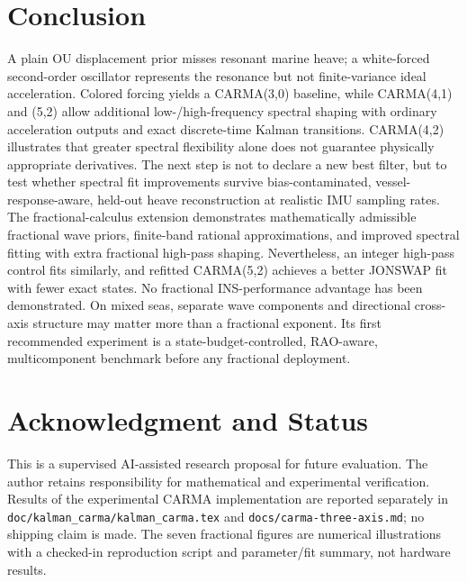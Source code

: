 \documentclass[10pt,journal]{IEEEtran}
\begin{document}


\section{Conclusion}
A plain OU displacement prior misses resonant marine
heave; a white-forced second-order oscillator represents
the resonance but not finite-variance ideal acceleration.
Colored forcing yields a CARMA(3,0) baseline, while
CARMA(4,1) and (5,2) allow additional low-/high-frequency
spectral shaping with ordinary acceleration outputs and
exact discrete-time Kalman transitions. CARMA(4,2)
illustrates that greater spectral flexibility alone
does not guarantee physically appropriate derivatives.
The next step is not to declare a new best filter, but
to test whether spectral fit improvements survive
bias-contaminated, vessel-response-aware, held-out
heave reconstruction at realistic IMU sampling rates.
The fractional-calculus extension demonstrates mathematically admissible
fractional wave priors, finite-band rational approximations, and improved
spectral fitting with extra fractional high-pass shaping. Nevertheless,
an integer high-pass control fits similarly, and refitted CARMA(5,2)
achieves a better JONSWAP fit with fewer exact states. No fractional
INS-performance advantage has been demonstrated.
On mixed seas, separate wave components and directional
cross-axis structure may matter more than a fractional exponent.
Its first recommended experiment is a state-budget-controlled,
RAO-aware, multicomponent benchmark before any fractional deployment.

\section*{Acknowledgment and Status}
This is a supervised AI-assisted research proposal
for future evaluation. The author retains responsibility
for mathematical and experimental verification.
Results of the experimental CARMA implementation are reported
separately in \texttt{doc/kalman\_carma/kalman\_carma.tex} and
\texttt{docs/carma-three-axis.md}; no shipping claim is made.
The seven fractional figures are numerical illustrations with a checked-in
reproduction script and parameter/fit summary, not hardware results.
\end{document}
